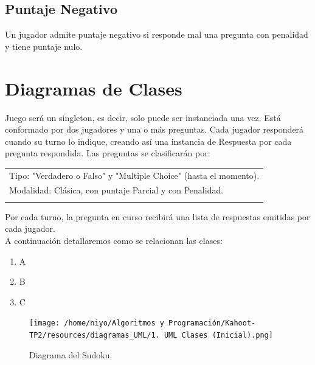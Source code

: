 \documentclass[titlepage,a4paper]{article}
\begin{document}
\subsection{Puntaje Negativo}

Un jugador admite puntaje negativo si responde mal una pregunta con penalidad y tiene puntaje nulo. 

\section{Diagramas de Clases}\label{sec:diagramasdeclase}

Juego será un singleton, es decir, solo puede ser instanciada una vez. Está conformado por dos jugadores y una o más preguntas. Cada jugador responderá cuando su turno lo indique, creando así una instancia de Respuesta por cada pregunta respondida. Las preguntas se clasificarán por:\\


\begin{tabular}{l}
Tipo: "Verdadero o Falso"$ $ y "Multiple Choice" $ $(hasta el momento).\\
Modalidad: Clásica, con puntaje Parcial y con Penalidad.\\\\
\end{tabular}

Por cada turno, la pregunta en curso recibirá una lista de respuestas emitidas por cada jugador. \\

A continuación detallaremos como se relacionan las clases:

\begin{enumerate}
\item A
\item B
\item C
\end{enumerate}


\begin{figure}[H]
\centering
\texttt{[image: /home/niyo/Algoritmos y Programación/Kahoot-TP2/resources/diagramas\_UML/1. UML Clases (Inicial).png]}
\caption{\label{fig:class01}Diagrama del Sudoku.}
\end{figure}
\end{document}
